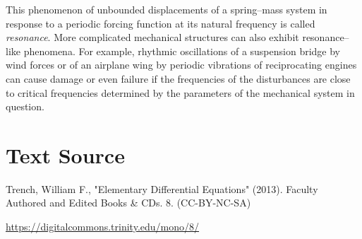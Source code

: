 \documentclass{ximera}
\begin{document}
This phenomenon of unbounded displacements of a spring--mass system in
response to a periodic forcing function at its natural
frequency is called \textit{resonance}. More complicated mechanical
structures can also exhibit resonance--like phenomena. For example,
rhythmic oscillations of a suspension bridge by wind forces or of an
airplane wing by periodic vibrations of reciprocating engines can
cause damage or even failure if the frequencies of the disturbances
are close to critical frequencies determined by the parameters of the
mechanical system in question.

\section*{Text Source}
Trench, William F., "Elementary Differential Equations" (2013). Faculty Authored and Edited Books \& CDs. 8. (CC-BY-NC-SA)

\href{https://digitalcommons.trinity.edu/mono/8/}{https://digitalcommons.trinity.edu/mono/8/}
\end{document}
